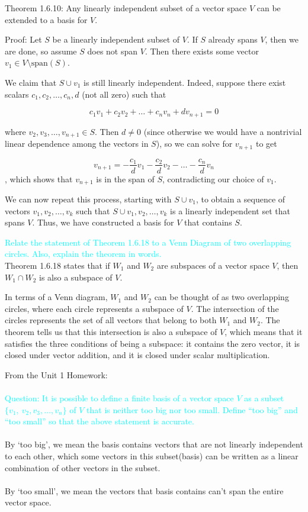 \documentclass[fontsize=12pt]{scrartcl}
\begin{document}
\noindent
Theorem 1.6.10: Any linearly independent subset of a vector space $V$ can be extended to a basis for $V$.

\noindent
Proof: Let $S$ be a linearly independent subset of $V$. If $S$ already spans $V$, then we are done, so assume $S$ does not span $V$. Then there exists some vector $v_1 \in V \setminus \text{span}(S)$.

\noindent
We claim that $S \cup {v_1}$ is still linearly independent. Indeed, suppose there exist scalars $c_1, c_2, \ldots, c_n, d$ (not all zero) such that

$$c_1v_1 + c_2v_2 + \ldots + c_nv_n + dv_{n+1} = 0$$

where $v_2, v_3, \ldots, v_{n+1} \in S$. Then $d \neq 0$ (since otherwise we would have a nontrivial linear dependence among the vectors in $S$), so we can solve for $v_{n+1}$ to get

$$v_{n+1} = -\frac{c_1}{d}v_1 - \frac{c_2}{d}v_2 - \ldots - \frac{c_n}{d}v_n$$, which shows that $v_{n+1}$ is in the span of $S$, contradicting our choice of $v_1$.

\noindent
We can now repeat this process, starting with $S \cup {v_1}$, to obtain a sequence of vectors $v_1, v_2, \ldots, v_k$ such that $S \cup {v_1, v_2, \ldots, v_k}$ is a linearly independent set that spans $V$. Thus, we have constructed a basis for $V$ that contains $S$.

\noindent
\textcolor{cyan}{Relate the statement of Theorem 1.6.18 to a Venn Diagram of two overlapping circles. Also, explain the theorem in words.}\\

\noindent
Theorem 1.6.18 states that if $W_1$ and $W_2$ are subspaces of a vector space $V$, then $W_1 \cap W_2$ is also a subspace of $V$.

\noindent
In terms of a Venn diagram, $W_1$ and $W_2$ can be thought of as two overlapping circles, where each circle represents a subspace of $V$. The intersection of the circles represents the set of all vectors that belong to both $W_1$ and $W_2$. The theorem tells us that this intersection is also a subspace of $V$, which means that it satisfies the three conditions of being a subspace: it contains the zero vector, it is closed under vector addition, and it is closed under scalar multiplication.

\noindent
From the Unit 1 Homework:\\
\\
\textcolor{cyan}{Question: It is possible to define a finite basis of a vector space $V$ as a subset $\{v_1, \ v_2, v_3, \dots, v_n\}$ of $V$ that is neither too big nor too small. Define ``too big'' and ``too small'' so that the above statement is accurate.}\\
\\
By `too big', we mean the basis contains vectors that are not linearly independent to each other, which some vectors in this subset(basis) can be written as a linear combination of other vectors in the subset. 
\\
\\
By `too small', we mean the vectors that basis contains can’t span the entire vector space. 
\end{document}

